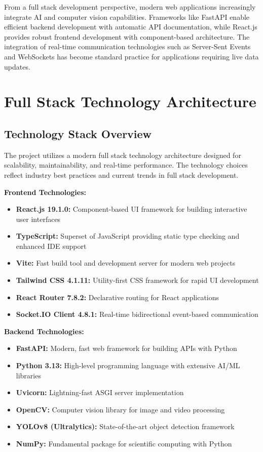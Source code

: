 \documentclass[conference]{IEEEtran}
\begin{document}
From a full stack development perspective, modern web applications increasingly integrate AI and computer vision capabilities. Frameworks like FastAPI enable efficient backend development with automatic API documentation, while React.js provides robust frontend development with component-based architecture. The integration of real-time communication technologies such as Server-Sent Events and WebSockets has become standard practice for applications requiring live data updates.

\section{Full Stack Technology Architecture}

\subsection{Technology Stack Overview}

The project utilizes a modern full stack technology architecture designed for scalability, maintainability, and real-time performance. The technology choices reflect industry best practices and current trends in full stack development.

\textbf{Frontend Technologies:}
\begin{itemize}
\item \textbf{React.js 19.1.0:} Component-based UI framework for building interactive user interfaces
\item \textbf{TypeScript:} Superset of JavaScript providing static type checking and enhanced IDE support
\item \textbf{Vite:} Fast build tool and development server for modern web projects
\item \textbf{Tailwind CSS 4.1.11:} Utility-first CSS framework for rapid UI development
\item \textbf{React Router 7.8.2:} Declarative routing for React applications
\item \textbf{Socket.IO Client 4.8.1:} Real-time bidirectional event-based communication
\end{itemize}

\textbf{Backend Technologies:}
\begin{itemize}
\item \textbf{FastAPI:} Modern, fast web framework for building APIs with Python
\item \textbf{Python 3.13:} High-level programming language with extensive AI/ML libraries
\item \textbf{Uvicorn:} Lightning-fast ASGI server implementation
\item \textbf{OpenCV:} Computer vision library for image and video processing
\item \textbf{YOLOv8 (Ultralytics):} State-of-the-art object detection framework
\item \textbf{NumPy:} Fundamental package for scientific computing with Python
\end{itemize}
\end{document}
